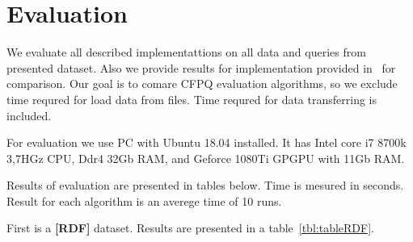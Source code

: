 \section{Evaluation}

We evaluate all described implementattions on all data and queries from presented dataset.
Also we provide results for implementation provided in~\cite{Azimov:2018:CPQ:3210259.3210264} for comparison.
Our goal is to comare CFPQ evaluation algorithms, so we exclude time requred for load data from files.
Time requred for data transferring is included.

For evaluation we use PC with Ubuntu 18.04 installed.
It has Intel core i7 8700k 3,7HGz CPU, Ddr4 32Gb RAM, and Geforce 1080Ti GPGPU with 11Gb RAM.

Results of evaluation are presented in tables below.
Time is mesured in seconds.
Result for each algorithm is an averege time of 10 runs.

First is a \textbf{[RDF]} dataset.
Results are presented in a table~\ref{tbl:tableRDF}.

